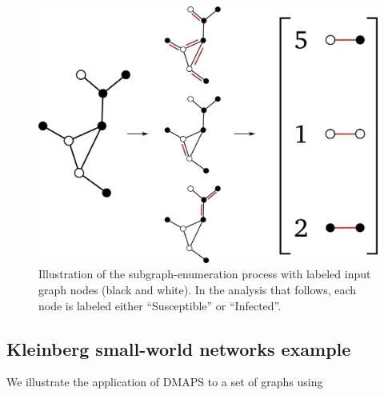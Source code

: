 \documentclass[11pt]{article}
\begin{document}
\begin{figure}[!h]
  \begin{center}
    \includegraphics[height=0.45\textheight]{subgraph_counting_labeled}
    \caption{Illustration of the subgraph-enumeration process with labeled input graph nodes (black and white). In the analysis that follows, each node is labeled either ``Susceptible'' or ``Infected''.}
    \label{fig:subgraph_counting}
  \end{center}
\end{figure}

\clearpage

\begin{multicols}{2}

\section{Kleinberg small-world networks example}

We illustrate the application of DMAPS to a set of graphs using 

\end{multicols}
\end{document}

